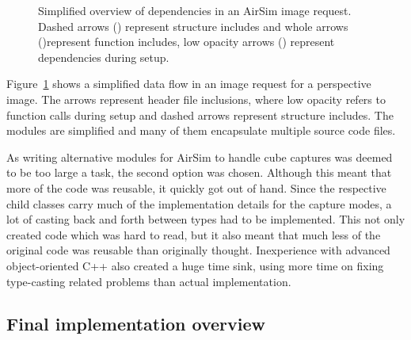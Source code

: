 \begin{figure}[!htb]
    \caption{Simplified overview of dependencies in an AirSim image request. Dashed arrows (\protect\drawdashedarrow) represent structure includes and whole arrows (\protect\drawarrow)represent function includes, low opacity arrows (\protect\drawopacitydarrow) represent dependencies during setup.}
    \label{fig:comm_pattern_camera_request}
\end{figure}
Figure~\ref{fig:comm_pattern_camera_request} shows a simplified data flow in an image request for a perspective image. The arrows represent header file inclusions, where low opacity refers to function calls during setup and dashed arrows represent structure includes. The modules are simplified and many of them encapsulate multiple source code files.

As writing alternative modules for AirSim to handle cube captures was deemed to be too large a task, the second option was chosen. Although this meant that more of the code was reusable, it quickly got out of hand. Since the respective child classes carry much of the implementation details for the capture modes, a lot of casting back and forth between types had to be implemented. This not only created code which was hard to read, but it also meant that much less of the original code was reusable than originally thought. Inexperience with advanced object-oriented C++ also created a huge time sink, using more time on fixing type-casting related problems than actual implementation.

\subsection{Final implementation overview} \label{subsec:Fisheye_impl_overview}

